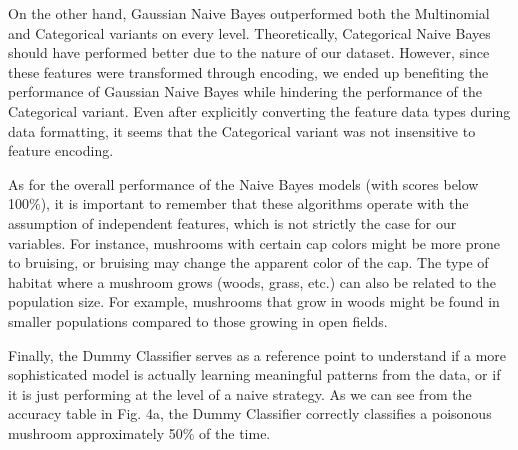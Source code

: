 \documentclass[11pt, conference]{IEEEtran}
\begin{document}
    On the other hand, Gaussian Naive Bayes outperformed both the Multinomial and Categorical variants on every level. Theoretically, Categorical Naive Bayes should have performed better due to the nature of our dataset.
    However, since these features were transformed through encoding, we ended up benefiting the performance of Gaussian Naive Bayes while hindering the performance of the Categorical variant. Even after explicitly converting the feature data types during data formatting, it seems that the Categorical variant was not insensitive to feature encoding. 

    As for the overall performance of the Naive Bayes models (with scores below 100\%), it is important to remember that these algorithms operate with the assumption of independent features, which is not strictly the case for our variables. For instance, mushrooms with certain cap colors might be more prone to bruising, or bruising may change the apparent color of the cap. The type of habitat where a mushroom grows (woods, grass, etc.) can also be related to the population size. For example, mushrooms that grow in woods might be found in smaller populations compared to those growing in open fields.

    Finally, the Dummy Classifier serves as a reference point to understand if a more sophisticated model is actually learning meaningful patterns from the data, or if it is just performing at the level of a naive strategy. As we can see from the accuracy table in Fig. 4a, the Dummy Classifier correctly classifies a poisonous mushroom approximately 50\% of the time.
\end{document}
